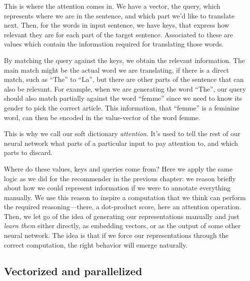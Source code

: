 \documentclass{pca}
\newcommand{\gc}[1]{{\color{my-green} #1}}
\newcommand{\rc}[1]{{\color{my-red} #1}}
\newcommand{\bc}[1]{{\color{my-blue} #1}}
\theoremstyle{theorem}
\theoremstyle{definition}
\theoremstyle{proof}
\begin{document}
This is where the attention comes in. We have a vector, the \bc{query}, which represents where we are in the sentence, and which part we'd like to translate next. Then, for the words in input sentence, we have \gc{keys}, that express how relevant they are for each part of the target sentence. Associated to these are \rc{values} which contain the information required for translating those words.

By matching the query against the keys, we obtain the relevant information. The main match might be the actual word we are translating, if there is a direct match, such as ``The'' to ``La'', but there are other parts of the sentence that can also be relevant. For example, when we are generating the word ``The'', our query should also match partially against the word ``femme'' since we need to know its gender to pick the correct article. This information, that ``femme'' is a feminine word, can then be encoded in the value-vector of the word femme. 

This is why we call our soft dictionary \emph{attention}. It's used to tell the rest of our neural network what parts of a particular input to pay attention to, and which parts to discard. 

Where do these values, keys and queries come from? Here we apply the same logic as we did for the recommender in the previous chapter: we reason briefly about how we could represent information if we were to annotate everything manually. We use this reason to inspire a computation that we think can perform the required reasoning---there, a dot-product score, here an attention operation. Then, we let go of the idea of generating our representations manually and just \emph{learn them} either directly, as embedding vectors, or as the output of some other neural network. The idea is that if we force our representations through the correct computation, the right behavior will emerge naturally.

\subsection{Vectorized and parallelized}
\end{document}
